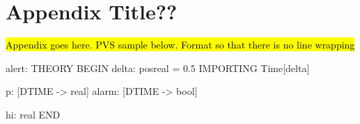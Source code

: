 \documentclass[fontsize=12pt,paper=letter,twoside]{scrartcl}
\begin{document}
\newpage
\appendix

\section{Appendix Title??}
\hl{Appendix goes here. PVS sample below. Format so that there is no line wrapping}

\begin{pvs}
alert: THEORY
BEGIN
  delta: posreal = 0.5 %
  IMPORTING Time[delta]

  p:     [DTIME -> real]  %
  alarm: [DTIME -> bool]

  hi: real
END 	
\end{pvs}
\end{document}
